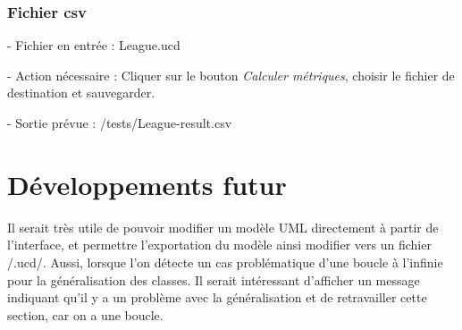 \documentclass[letter,french]{report}
\begin{document}
  \subsubsection{Fichier csv}
  - Fichier en entrée : League.ucd

  - Action nécessaire : Cliquer sur le bouton \emph{Calculer métriques},
  choisir le fichier de destination et sauvegarder.

  - Sortie prévue : /tests/League-result.csv
  

	\section*{Développements futur}
	Il serait très utile de pouvoir modifier un modèle UML directement à partir de l'interface,
	et permettre l'exportation du modèle ainsi modifier vers un fichier /.ucd/. Aussi, lorsque l'on détecte un cas problématique d'une boucle à l'infinie pour la généralisation des classes. Il serait intéressant d'afficher un message indiquant qu'il y a un problème avec la généralisation et de retravailler cette section, car on a une boucle. 
	
	
\end{document}

